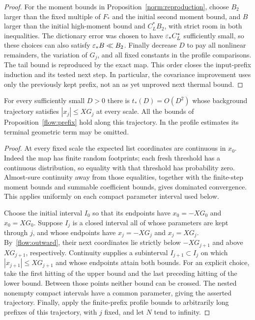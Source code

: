 \begin{proof}
For the moment bounds in Proposition~\ref{norm:reproduction}, choose
$B_2$ larger than the fixed multiple of $F_*$ and the initial second
moment bound, and $B$ larger than the initial high-moment bound and
$C_L^*B_2$, with strict room in both inequalities.  The dictionary error
was chosen to have $\varepsilon_* C_L^*$ sufficiently small, so these
choices can also satisfy $\varepsilon_*B\ll B_2$.  Finally decrease $D$ to
pay all nonlinear remainders, the variation of $G_j$, and all fixed
constants in the profile comparisons.  The tail bound is reproduced by
the exact map.  This order closes the input-prefix induction and its
tested next step.  In particular, the covariance improvement uses only
the previously kept prefix, not an as yet unproved next thermal bound.
\end{proof}

\begin{proposition}\label{flow:tuned}
For every sufficiently small $D>0$ there is $t_*(D)=O(D^2)$ whose
background trajectory satisfies $|x_j|\le XG_j$ at every scale.
All the bounds of Proposition~\ref{flow:prefix} hold along this
trajectory.  In the profile estimates its terminal geometric term may
be omitted.
\end{proposition}

\begin{proof}
At every fixed scale the expected list coordinates are continuous in
$x_0$.  Indeed the map has finite random footprints; each fresh threshold
has a continuous distribution, so equality with that threshold has
probability zero.  Almost-sure continuity away from those equalities,
together with the finite-step moment bounds and summable coefficient
bounds, gives dominated convergence.  This applies uniformly on each
compact parameter interval used below.

Choose the initial interval $I_0$ so that its endpoints have
$x_0=-XG_0$ and $x_0=XG_0$.  Suppose $I_j$ is a closed interval all of
whose parameters are kept through $j$, and whose endpoints have
$x_j=-XG_j$ and $x_j=XG_j$.  By~\eqref{flow:outward}, their next
coordinates lie strictly below $-XG_{j+1}$ and above $XG_{j+1}$,
respectively.  Continuity supplies a subinterval $I_{j+1}\subset I_j$
on which $|x_{j+1}|\le XG_{j+1}$ and whose endpoints attain both bounds.
For an explicit choice, take the first hitting of the upper bound and
the last preceding hitting of the lower bound.  Between those points
neither bound can be crossed.  The nested nonempty compact intervals
have a common parameter, giving the asserted trajectory.  Finally,
apply the finite-prefix profile bounds to arbitrarily long prefixes of
this trajectory, with $j$ fixed, and let $N$ tend to infinity.
\end{proof}

